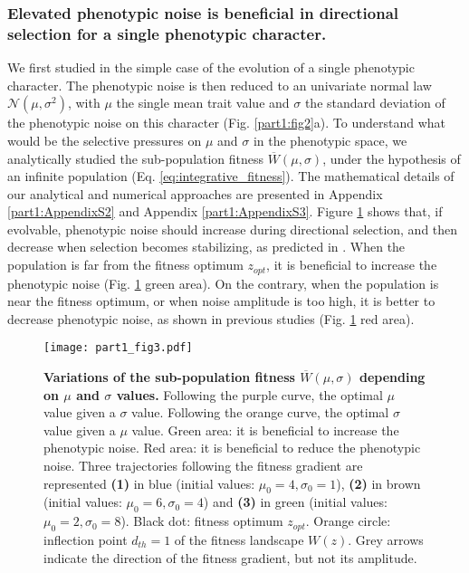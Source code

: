 
\subsubsection{Elevated phenotypic noise is beneficial in directional selection for a single phenotypic character.}

We first studied {\sigmaFGM} in the simple case of the evolution of a single phenotypic character. The phenotypic noise is then reduced to an univariate normal law $\mathcal{N}(\mu,\sigma^2)$, with $\mu$ the single mean trait value and $\sigma$ the standard deviation of the phenotypic noise on this character (Fig. \ref{part1:fig2}a). To understand what would be the selective pressures on $\mu$ and $\sigma$ in the phenotypic space, we analytically studied the sub-population fitness $\overline{W}(\mu,\sigma)$, under the hypothesis of an infinite population (Eq. \ref{eq:integrative_fitness}). The mathematical details of our analytical and numerical approaches are presented in Appendix \ref{part1:AppendixS2} and Appendix \ref{part1:AppendixS3}. Figure \ref{part1:fig3} shows that, if evolvable, phenotypic noise should increase during directional selection, and then decrease when selection becomes stabilizing, as predicted in \cite{eldar-and-elowitz-2010}.
When the population is far from the fitness optimum $z_{opt}$, it is beneficial to increase the phenotypic noise (Fig. \ref{part1:fig3} green area). On the contrary, when the population is near the fitness optimum, or when noise amplitude is too high, it is better to decrease phenotypic noise, as shown in previous studies \citep{mineta-et-al-2015,keren-et-al-2016} (Fig. \ref{part1:fig3} red area).

\begin{figure}[!ht]
\centering
\texttt{[image: part1\_fig3.pdf]}
\caption[Variations of the sub-population fitness $\overline{W}(\mu,\sigma)$ depending on $\mu$ and $\sigma$ values.]{\textbf{Variations of the sub-population fitness $\overline{W}(\mu,\sigma)$ depending on $\mu$ and $\sigma$ values.}
Following the purple curve, the optimal $\mu$ value given a $\sigma$ value. Following the orange curve, the optimal $\sigma$ value given a $\mu$ value. Green area: it is beneficial to increase the phenotypic noise. Red area: it is beneficial to reduce the phenotypic noise. Three trajectories following the fitness gradient are represented \textbf{(1)} in blue (initial values: $\mu_0=4, \sigma_0=1$), \textbf{(2)} in brown (initial values: $\mu_0=6, \sigma_0=4$) and \textbf{(3)} in green (initial values: $\mu_0=2, \sigma_0=8$). Black dot: fitness optimum $z_{opt}$. Orange circle: inflection point $d_{th}=1$ of the fitness landscape $W(z)$. Grey arrows indicate the direction of the fitness gradient, but not its amplitude.
}
\label{part1:fig3}
\end{figure}

